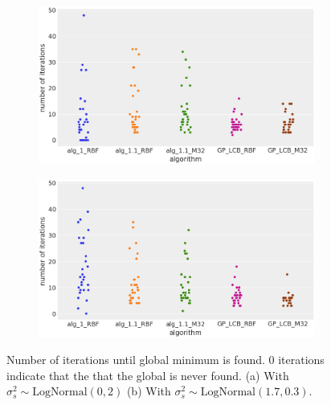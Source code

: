 \begin{figure}[H]
        \centering
        \begin{subfigure}[b]{0.475\textwidth}
            \centering
            \includegraphics[width=\textwidth]{src/performanceplotorignalprior.png}
            \caption{}
            \label{fig:performance1}
        \end{subfigure}
        \hfill
        \begin{subfigure}[b]{0.475\textwidth}  
            \centering 
            \includegraphics[width=\textwidth]{src/performanceplotsnewprior.png}
            \caption{}
            \label{fig:performance2}
        \end{subfigure}
        \caption[]
        {Number of iterations until global minimum is found. 0 iterations indicate that the that the global is never found. (a) With $\sigma_\mathit{s}^2\sim\text{LogNormal}(0, 2)$ (b) With $\sigma_\mathit{s}^2\sim\text{LogNormal}(1.7, 0.3)$.} 
        \label{fig:performanceplots}
    \end{figure}

